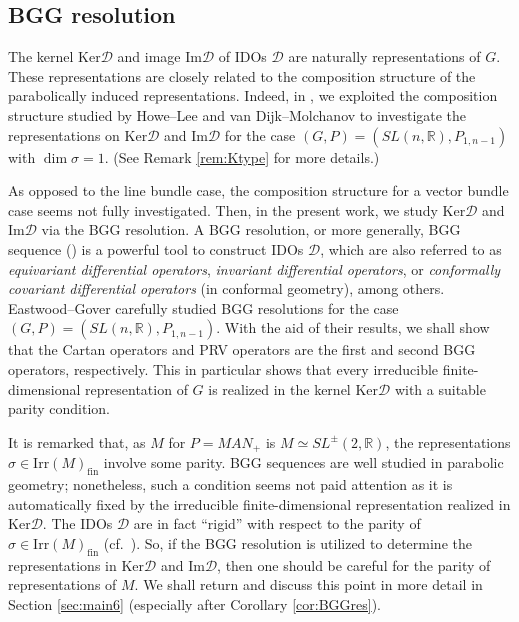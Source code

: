 \documentclass[reqno,11pt]{amsart}
\theoremstyle{remark}
\numberwithin{equation}{section}
\newcommand{\R}{\mathbb{R}}
\newcommand{\Cal}{\mathcal}
\renewcommand{\Im}{\mathrm{Im}}
\newcommand{\Irr}{\mathrm{Irr}}
\newcommand{\fin}{\mathrm{fin}}
\newcommand{\D}{\Cal{D}}
\newcommand{\Ker}{\mathrm{Ker}}
\begin{document}
\vskip 0.1in

\subsection{BGG resolution}
The kernel $\Ker \D$ and image $\Im \D$ 
of IDOs $\D$ are naturally representations of $G$.
These representations are closely related to the composition structure of the 
parabolically induced representations. Indeed, in \cite{KuOr25a},
we exploited the composition structure studied by Howe--Lee \cite{HL99} and 
van Dijk--Molchanov \cite{vDM99} to investigate the representations on
$\Ker\D$ and $\Im \D$ for the case $(G, P)=(SL(n,\R), P_{1,n-1})$ 
with $\dim \sigma =1$. (See Remark \ref{rem:Ktype} for more details.)

As opposed to the line bundle case, the composition structure for a vector 
bundle case seems not fully investigated. Then, in the present work, we study
$\Ker \D$ and $\Im \D$ via the BGG resolution. A BGG resolution, or more 
generally, BGG sequence (\cite{CD01, CSS01}) is a powerful tool to construct
IDOs $\D$, which are also referred to as 
\emph{equivariant differential operators},
\emph{invariant differential operators}, or \emph{conformally covariant differential operators} (in conformal geometry), among others.
Eastwood--Gover \cite{EG11} carefully studied BGG resolutions 
for the case $(G, P)=(SL(n,\R), P_{1,n-1})$. With the aid of their results,
we shall show that the Cartan operators and PRV operators are the first and second 
BGG operators, respectively. This in particular shows that every irreducible 
finite-dimensional representation of $G$ is realized in the kernel $\Ker \D$
with a suitable parity condition.

It is remarked that, as $M$ for $P=MAN_+$ 
is $M\simeq SL^{\pm}(2,\R)$,
the representations $\sigma\in\Irr(M)_{\fin}$ involve some parity.
BGG sequences are well studied in parabolic geometry; nonetheless,
such a condition seems not paid attention
as it is automatically 
fixed by the irreducible finite-dimensional representation realized in $\Ker \D$. 
The  IDOs $\D$ are in fact ``rigid'' with respect to the parity of $\sigma \in \Irr(M)_\fin$
(cf.\ \cite[Lem.\ 2.17]{KuOr19}).
So, if the BGG resolution is utilized to determine the representations 
in $\Ker \D$ and $\Im \D$, then
one should be careful for the parity of representations of $M$.
We shall return and discuss this point in more detail in Section \ref{sec:main6}
(especially after Corollary \ref{cor:BGGres}).
\end{document}
